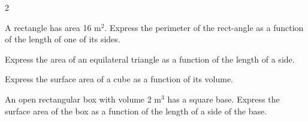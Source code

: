 \documentclass{sebase}
\begin{document}
\begin{multicols}{2}
\begin{ExerciseList}
%

%

\item[$\hfill $52.] A rectangle has area 16 m$^{2}$. Express the perimeter
of the rect-angle as a function of the length of one of its sides.

%

\item[$\hfill $53.] Express the area of an equilateral triangle as a
function of the length of a side.

%

%

\item[$\hfill $54.] Express the surface area of a cube as a function of its
volume.

%

\item[{$\hfill $\protect\fbox{\hspace{-2pt}55.\hspace{-2pt}}}] An open
rectangular box with volume 2 m$^{3}$ has a square base. Express the surface
area of the box as a function of the length of a side of the base.

%


\end{ExerciseList}
\end{multicols}
\end{document}
